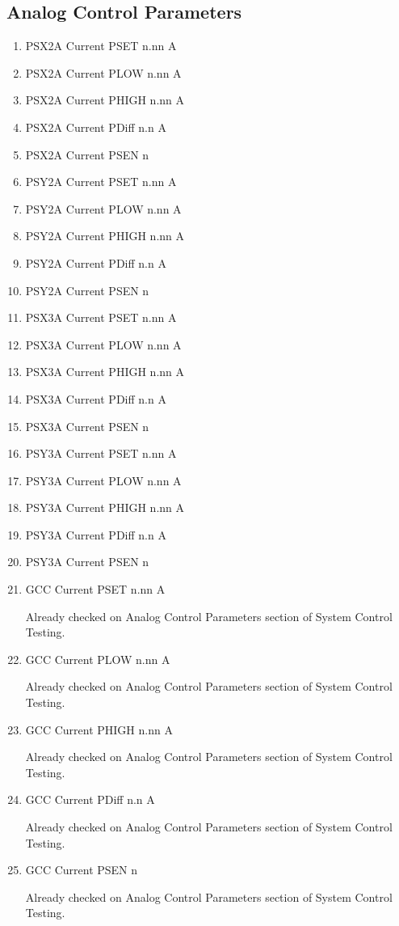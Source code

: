 \documentclass[11pt]{book}		%
\begin{document}
\subsection{Analog Control Parameters}

\begin{enumerate}
 \item PSX2A Current PSET  n.nn A
 \item PSX2A Current PLOW  n.nn A
 \item PSX2A Current PHIGH n.nn A
 \item PSX2A Current PDiff n.n A
 \item PSX2A Current PSEN  n
 \item PSY2A Current PSET  n.nn A
 \item PSY2A Current PLOW  n.nn A
 \item PSY2A Current PHIGH n.nn A
 \item PSY2A Current PDiff n.n A
 \item PSY2A Current PSEN  n
 \item PSX3A Current PSET  n.nn A
 \item PSX3A Current PLOW  n.nn A
 \item PSX3A Current PHIGH n.nn A
 \item PSX3A Current PDiff n.n A
 \item PSX3A Current PSEN  n
 \item PSY3A Current PSET  n.nn A
 \item PSY3A Current PLOW  n.nn A
 \item PSY3A Current PHIGH n.nn A
 \item PSY3A Current PDiff n.n A
 \item PSY3A Current PSEN  n
 \item GCC Current PSET  n.nn A

\color{red}
Already checked on Analog Control Parameters section of System Control Testing.
\color{black}

 \item GCC Current PLOW  n.nn A

\color{red}
Already checked on Analog Control Parameters section of System Control Testing.
\color{black}

 \item GCC Current PHIGH n.nn A

\color{red}
Already checked on Analog Control Parameters section of System Control Testing.
\color{black}

 \item GCC Current PDiff n.n A

\color{red}
Already checked on Analog Control Parameters section of System Control Testing.
\color{black}

 \item GCC Current PSEN  n

\color{red}
Already checked on Analog Control Parameters section of System Control Testing.
\color{black}

\end{enumerate}
\end{document}
